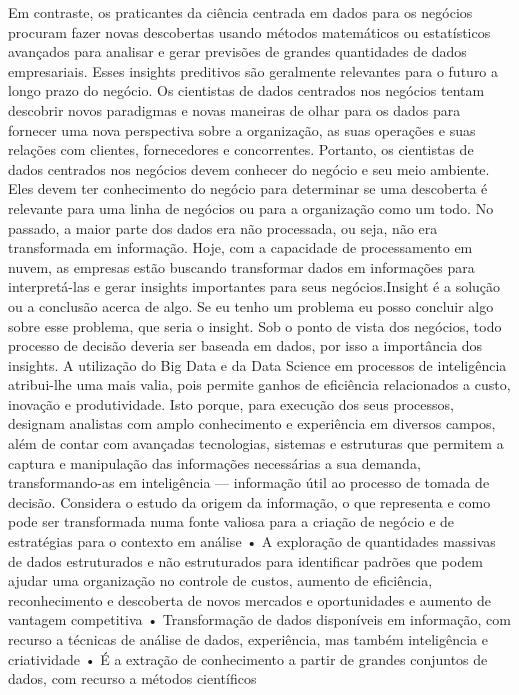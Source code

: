 Em contraste, os praticantes da ciência centrada em dados para os negócios procuram fazer novas descobertas usando métodos matemáticos ou estatísticos avançados para analisar e gerar previsões de grandes quantidades de dados empresariais. Esses insights preditivos são geralmente relevantes para o futuro a longo prazo do negócio. Os cientistas de dados centrados nos negócios tentam descobrir novos paradigmas e novas maneiras de olhar para os dados para fornecer uma nova perspectiva sobre a organização, as suas operações e suas relações com clientes, fornecedores e concorrentes. Portanto, os cientistas de dados centrados nos negócios devem conhecer do negócio e seu meio ambiente. Eles devem ter conhecimento do negócio para determinar se uma descoberta é relevante para uma linha de negócios ou para a organização como um todo.
No passado, a maior parte dos dados era não processada, ou seja, não era transformada em informação. Hoje, com a capacidade de processamento em nuvem, as empresas estão buscando transformar dados em informações para interpretá-las e gerar insights importantes para seus negócios.Insight é a solução ou a conclusão acerca de algo. Se eu tenho um problema eu posso concluir algo sobre esse problema, que seria o insight. Sob o ponto de vista dos negócios, todo processo de decisão deveria ser baseada em dados, por isso a importância dos insights.
A utilização do Big Data e da Data Science em processos de inteligência atribui-lhe uma mais valia, pois permite ganhos de eficiência relacionados a custo, inovação e produtividade. Isto porque, para execução dos seus processos, designam analistas com amplo conhecimento e experiência em diversos campos, além de contar com avançadas tecnologias, sistemas e estruturas que permitem a captura e manipulação das informações necessárias a sua demanda, transformando-as em inteligência — informação útil ao processo de tomada de decisão.
 Considera o estudo da origem da informação, o que representa e como pode ser transformada numa fonte valiosa para a criação de negócio e de estratégias para o contexto em análise • A exploração de quantidades massivas de dados estruturados e não estruturados para identificar padrões que podem ajudar uma organização no controle de custos, aumento de eficiência, reconhecimento e descoberta de novos mercados e oportunidades e aumento de vantagem competitiva • Transformação de dados disponíveis em informação, com recurso a técnicas de análise de dados, experiência, mas também inteligência e criatividade • É a extração de conhecimento a partir de grandes conjuntos de dados, com recurso a métodos científicos

